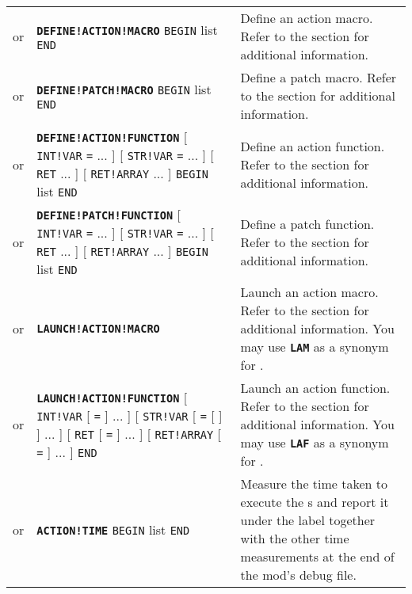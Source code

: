 \documentclass{article}
\def\ttref#1{\ahrefloc{#1}{\tt #1}}
\def\DEFINE#1{{\tt \bf #1}\label{#1}\index{#1}}
\def\t#1{{\tt #1}}
\def\Slist{{\color{red} list }}
\def\Ob{{\color{red} [ }}
\def\Oe{{\color{red} ] }}
\begin{document}
\begin{tabular}{cp{10in}|p{10in}}
or & \DEFINE{DEFINE!ACTION!MACRO} \ttref{String} \t{BEGIN}
     \ttref{TP2 Action} \Slist \t{END} &
  Define an action macro. Refer to the \ttref{macros} section for
  additional information. \\
or & \DEFINE{DEFINE!PATCH!MACRO} \ttref{String} \t{BEGIN}
     \ttref{patch} \Slist \t{END} &
  Define a patch macro. Refer to the \ttref{macros} section for
  additional information. \\
or & \DEFINE{DEFINE!ACTION!FUNCTION} \ttref{String}
     \Ob \t{INT!VAR} \ttref{variable} \t{=} \ttref{value} ... \Oe
     \Ob \t{STR!VAR} \ttref{variable} \t{=} \ttref{String} ... \Oe
     \Ob \t{RET} \ttref{variable} ... \Oe
     \Ob \t{RET!ARRAY} \ttref{variable} ... \Oe
     \t{BEGIN} \ttref{TP2 Action} \Slist
     \t{END} &
  Define an action function. Refer to the \ttref{Functions} section for
  additional information. \\
or & \DEFINE{DEFINE!PATCH!FUNCTION} \ttref{String}
     \Ob \t{INT!VAR} \ttref{variable} \t{=} \ttref{value} ... \Oe
     \Ob \t{STR!VAR} \ttref{variable} \t{=} \ttref{String} ... \Oe
     \Ob \t{RET} \ttref{variable} ... \Oe
     \Ob \t{RET!ARRAY} \ttref{variable} ... \Oe
     \t{BEGIN} \ttref{patch} \Slist
     \t{END} &
  Define a patch function. Refer to the \ttref{Functions} section for
  additional information. \\
or & \DEFINE{LAUNCH!ACTION!MACRO} \ttref{String} &
  Launch an action macro. Refer to the \ttref{macros} section for
  additional information. You may use \DEFINE{LAM} as a synonym for
  \ttref{LAUNCH!ACTION!MACRO}.\\
or & \DEFINE{LAUNCH!ACTION!FUNCTION} \ttref{String}
     \Ob \t{INT!VAR} \ttref{variable} \Ob \t{=} \ttref{value} \Oe ... \Oe
     \Ob \t{STR!VAR} \ttref{variable} \Ob \t{=} \Ob \ttref{EVALUATE!BUFFER}
     \Oe \ttref{String} \Oe ... \Oe
     \Ob \t{RET} \ttref{variable} \Ob \t{=} \ttref{String} \Oe ... \Oe
     \Ob \t{RET!ARRAY} \ttref{variable} \Ob \t{=} \ttref{String} \Oe ... \Oe
     \t{END} &
  Launch an action function. Refer to the \ttref{Functions} section for
  additional information. You may use \DEFINE{LAF} as a synonym for
  \ttref{LAUNCH!ACTION!FUNCTION}.\\
or & \DEFINE{ACTION!TIME} \ttref{String} \t{BEGIN} \ttref{TP2 Action}
     \Slist \t{END} &
  Measure the time taken to execute the \ttref{TP2 Action}s and report
  it under the label \ttref{String} together with the other time
  measurements at the end of the mod's debug file.\\


\end{tabular}
\end{document}
